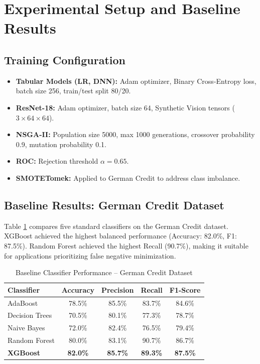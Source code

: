 \documentclass[12pt,a4paper]{article}
\begin{document}
\section{Experimental Setup and Baseline Results}

\subsection{Training Configuration}

\begin{itemize}
    \item \textbf{Tabular Models (LR, DNN):} Adam optimizer, Binary Cross-Entropy loss, batch size 256, train/test split 80/20.
    \item \textbf{ResNet-18:} Adam optimizer, batch size 64, Synthetic Vision tensors ($3 \times 64 \times 64$).
    \item \textbf{NSGA-II:} Population size 5000, max 1000 generations, crossover probability 0.9, mutation probability 0.1.
    \item \textbf{ROC:} Rejection threshold $\alpha = 0.65$.
    \item \textbf{SMOTETomek:} Applied to German Credit to address class imbalance.
\end{itemize}

\subsection{Baseline Results: German Credit Dataset}

Table \ref{tab:baseline_german} compares five standard classifiers on the German Credit dataset. XGBoost achieved the highest balanced performance (Accuracy: 82.0\%, F1: 87.5\%). Random Forest achieved the highest Recall (90.7\%), making it suitable for applications prioritizing false negative minimization.

\begin{table}[h]
\centering
\caption{Baseline Classifier Performance -- German Credit Dataset}
\label{tab:baseline_german}
\begin{tabular}{lcccc}
\toprule
\textbf{Classifier} & \textbf{Accuracy} & \textbf{Precision} & \textbf{Recall} & \textbf{F1-Score} \\
\midrule
AdaBoost        & 78.5\% & 85.5\% & 83.7\% & 84.6\% \\
Decision Trees  & 70.5\% & 80.1\% & 77.3\% & 78.7\% \\
Naive Bayes     & 72.0\% & 82.4\% & 76.5\% & 79.4\% \\
Random Forest   & 80.0\% & 83.1\% & 90.7\% & 86.7\% \\
\textbf{XGBoost} & \textbf{82.0\%} & \textbf{85.7\%} & \textbf{89.3\%} & \textbf{87.5\%} \\
\bottomrule
\end{tabular}
\end{table}
\end{document}
